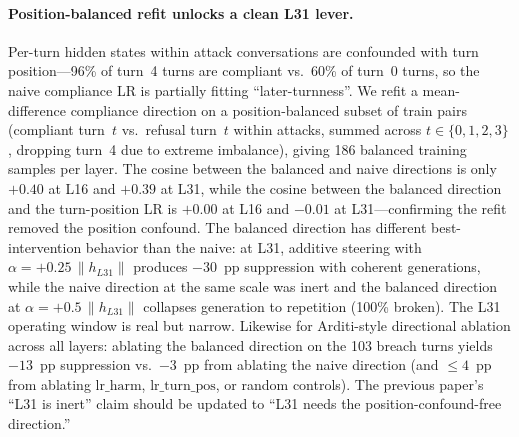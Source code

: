 \documentclass[11pt]{article}
\begin{document}
\paragraph{Position-balanced refit unlocks a clean L31 lever.}
Per-turn hidden states within attack conversations are confounded with turn position---96\% of turn~4 turns are compliant vs.\ 60\% of turn~0 turns, so the naive compliance LR is partially fitting ``later-turnness''.
We refit a mean-difference compliance direction on a position-balanced subset of train pairs (compliant turn~$t$ vs.\ refusal turn~$t$ within attacks, summed across $t \in \{0,1,2,3\}$, dropping turn~4 due to extreme imbalance), giving 186 balanced training samples per layer.
The cosine between the balanced and naive directions is only $+0.40$ at L16 and $+0.39$ at L31, while the cosine between the balanced direction and the turn-position LR is $+0.00$ at L16 and $-0.01$ at L31---confirming the refit removed the position confound.
The balanced direction has different best-intervention behavior than the naive: at L31, additive steering with $\alpha = +0.25\,\|h_{L31}\|$ produces $-30$~pp suppression with coherent generations, while the naive direction at the same scale was inert and the balanced direction at $\alpha = +0.5\,\|h_{L31}\|$ collapses generation to repetition (100\% broken).
The L31 operating window is real but narrow.
Likewise for Arditi-style directional ablation across all layers: ablating the balanced direction on the 103 breach turns yields $-13$~pp suppression vs.\ $-3$~pp from ablating the naive direction (and $\le 4$~pp from ablating $\mathrm{lr\_harm}$, $\mathrm{lr\_turn\_pos}$, or random controls).
The previous paper's ``L31 is inert'' claim should be updated to ``L31 needs the position-confound-free direction.''
\end{document}
